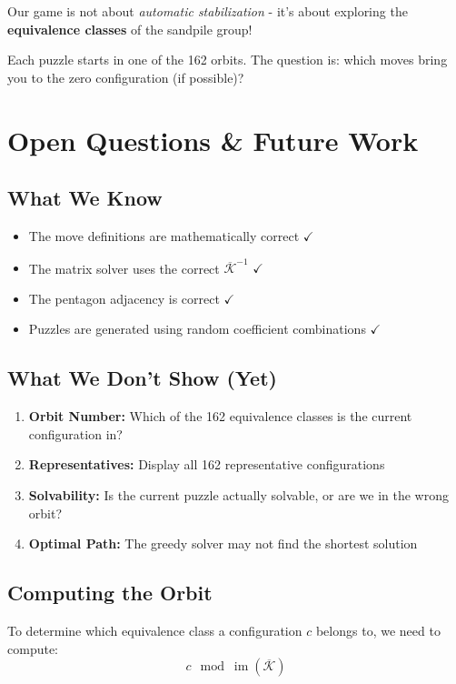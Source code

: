 \documentclass[11pt]{article}
\DeclareMathOperator{\im}{im}
\begin{document}
Our game is not about \emph{automatic stabilization} - it's about exploring the \textbf{equivalence classes} of the sandpile group!

Each puzzle starts in one of the 162 orbits. The question is: which moves bring you to the zero configuration (if possible)?

\section{Open Questions \& Future Work}

\subsection{What We Know}

\begin{itemize}
    \item The move definitions are mathematically correct $\checkmark$
    \item The matrix solver uses the correct $\overline{\mathcal{K}}^{-1}$ $\checkmark$
    \item The pentagon adjacency is correct $\checkmark$
    \item Puzzles are generated using random coefficient combinations $\checkmark$
\end{itemize}

\subsection{What We Don't Show (Yet)}

\begin{enumerate}
    \item \textbf{Orbit Number:} Which of the 162 equivalence classes is the current configuration in?
    \item \textbf{Representatives:} Display all 162 representative configurations
    \item \textbf{Solvability:} Is the current puzzle actually solvable, or are we in the wrong orbit?
    \item \textbf{Optimal Path:} The greedy solver may not find the shortest solution
\end{enumerate}

\subsection{Computing the Orbit}

To determine which equivalence class a configuration $c$ belongs to, we need to compute:
\[
c \mod \im(\overline{\mathcal{K}})
\]
\end{document}
